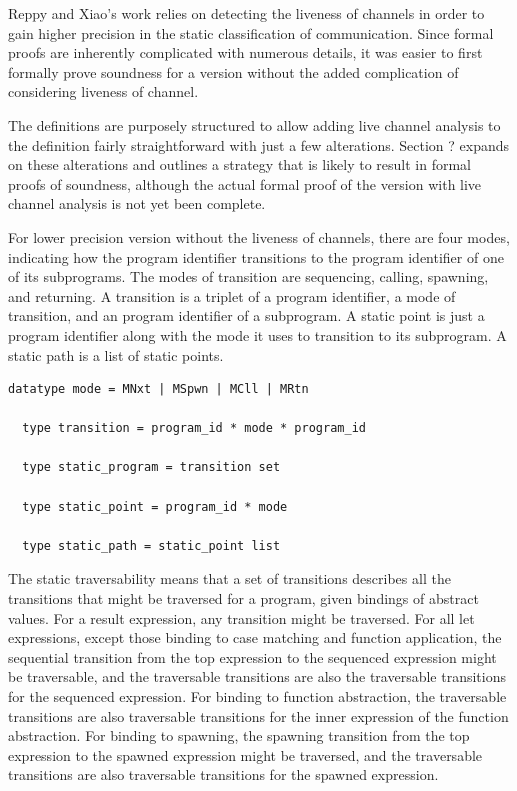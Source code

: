 \documentclass{article}
\begin{document}
Reppy and Xiao's work relies on detecting the liveness of channels in order to gain higher
precision in the static classification of communication. Since formal proofs are inherently
complicated with numerous details, it was easier to first formally prove soundness for a
version without the added complication of considering liveness of channel.

The definitions are purposely structured to allow adding live channel analysis to the
definition fairly straightforward with just a few alterations.  Section ? expands on
these alterations and outlines a strategy that is likely to result in formal proofs of
soundness, although the actual formal proof of the version with live channel analysis is
not yet been complete.  

For lower precision version without the liveness of channels, there are four modes,
indicating how the program identifier transitions to the program identifier of one of
its subprograms.
The modes of transition are sequencing, calling, spawning, and returning. A transition is a
triplet of a program identifier, a mode of transition, and an program identifier of a
subprogram. A static point is just a program identifier along with the mode it uses to
transition to its subprogram. A static path is a list of static points.  

\begin{lstlisting}[language=logic, escapechar=\%]
  datatype mode = MNxt | MSpwn | MCll | MRtn

  type transition = program_id * mode * program_id

  type static_program = transition set

  type static_point = program_id * mode

  type static_path = static_point list
  \end{lstlisting}

The static traversability means that a set of transitions describes all the transitions
that might be traversed for a program, given bindings of abstract values.  For a result
expression, any transition might be traversed.  For all let expressions, except those binding
to case matching and function application, the sequential transition from the top expression to
the sequenced expression might be traversable, and the traversable transitions are also the
traversable transitions for the sequenced expression.  For binding to function abstraction, the
traversable transitions are also traversable transitions for the inner expression of the
function abstraction.  For binding to spawning, the spawning transition from the top expression
to the spawned expression might be traversed, and the traversable transitions are also
traversable transitions for the spawned expression.
\end{document}
